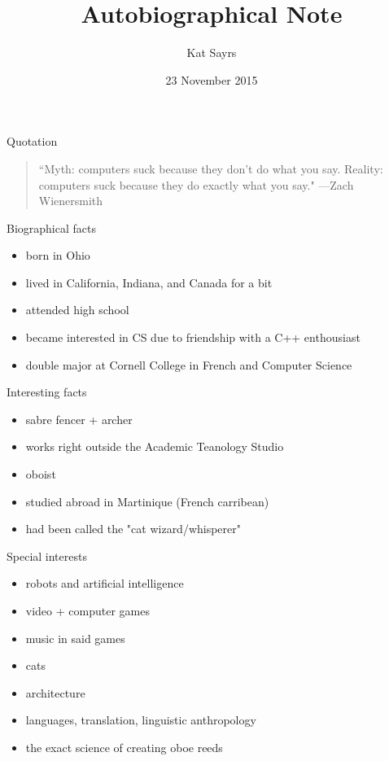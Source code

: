 \documentclass{beamer}
\title{Autobiographical Note}
\author{Kat Sayrs}
\institute{Cornell College}
\date{23 November 2015}
\begin{document}
\begin{frame}
  \titlepage
\end{frame}

\begin{frame}{Quotation}
\begin{quotation}
\noindent
``Myth: computers suck because they don't do what you say.\newline
Reality: computers suck because they do exactly what you say."
  \flushright
  ---Zach Wienersmith
  \end{quotation}
\end{frame}

\begin{frame}{Biographical facts}
\begin{itemize}
  \item born in Ohio
  \item lived in California, Indiana, and Canada for a bit
  \item attended high school
  \item became interested in CS due to friendship with a C++ enthousiast
  \item double major at Cornell College in French and Computer Science
  \end{itemize}
\end{frame}

\begin{frame}{Interesting facts}
\begin{itemize}
  \item sabre fencer + archer
  \item works right outside the Academic Teanology Studio
  \item oboist
  \item studied abroad in Martinique (French carribean)
  \item had been called the "cat wizard/whisperer"
  \end{itemize}
\end{frame}

\begin{frame}{Special interests}
\begin{itemize}
  \item robots and artificial intelligence
  \item video + computer games
  \item music in said games
  \item cats
  \item architecture
  \item languages, translation, linguistic anthropology
  \item the exact science of creating oboe reeds
  \end{itemize}
\end{frame}
\end{document}
